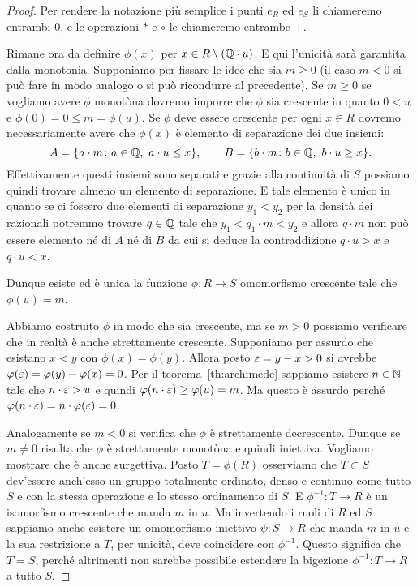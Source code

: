 \begin{proof}
Per rendere la notazione più semplice
i punti $e_R$ ed $e_S$ li chiameremo entrambi $0$,
e le operazioni $*$ e $\circ$ le chiameremo entrambe $+$.


Rimane ora da definire $\phi(x)$ per $x\in R \setminus ({\mathbb Q}\cdot u)$.
E qui l'unicità sarà garantita dalla monotonia. 
Supponiamo per fissare le idee che sia $m\ge 0$
(il caso $m<0$ si può fare in modo analogo o si può ricondurre al precedente).
Se $m\ge 0$ se vogliamo avere $\phi$ monotòna dovremo imporre che 
$\phi$ sia crescente in quanto $0<u$ e $\phi(0) = 0 \le m = \phi(u)$. 
Se $\phi$ deve essere crescente per ogni $x\in R$
dovremo necessariamente avere che $\phi(x)$ è elemento di separazione 
dei due insiemi:
\[
A = {\left\{ a\cdot m\colon a\in {\mathbb Q},\ a\cdot u \le x  \right\}},\qquad
B = {\left\{ b\cdot m\colon b\in {\mathbb Q},\ b\cdot u \ge x \right\}}.
\]
Effettivamente questi insiemi sono separati e grazie alla continuità di $S$ 
possiamo quindi trovare almeno un elemento di separazione. 
E tale elemento è unico in quanto se ci fossero due elementi di separazione 
$y_1<y_2$ per la densità dei razionali potremmo trovare $q \in {\mathbb Q}$
tale che $y_1 < q_1\cdot m < y_2$ e allora $q\cdot m$ non può essere elemento 
né di $A$ né di $B$ da cui si deduce la contraddizione 
$q\cdot u >x$ e $q\cdot u < x$.

Dunque esiste ed è unica la funzione $\phi\colon R \to S$ 
omomorfismo crescente tale che $\phi(u)=m$.

Abbiamo costruito $\phi$ in modo che sia crescente, 
ma se $m>0$ possiamo verificare che in realtà è anche strettamente crescente. 
Supponiamo per assurdo che esistano $x<y$ con $\phi(x)=\phi(y)$.
Allora posto $\varepsilon=y-x>0$ si avrebbe $\varphi(\varepsilon) = \varphi(y)-\varphi(x) = 0$. 
Per il teorema~\ref{th:archimede}
sappiamo esistere $n\in {\mathbb N}$ tale che $n\cdot \varepsilon > u$
e quindi $\varphi(n\cdot \varepsilon) \ge \varphi(u) = m$.
Ma questo è assurdo perché $\varphi(n\cdot \varepsilon) = n\cdot \varphi(\varepsilon)=0$.

Analogamente se $m<0$ si verifica che $\phi$ è strettamente decrescente.
Dunque se $m\neq 0$ risulta che $\phi$ è strettamente monotòna e quindi 
iniettiva.
Vogliamo mostrare che è anche surgettiva. 
Posto $T=\phi(R)$ osserviamo che $T\subset S$ dev'essere anch'esso 
un gruppo totalmente ordinato, denso e continuo come tutto $S$
e con la stessa operazione e lo stesso ordinamento di $S$.
E $\phi^{-1}\colon T\to R$ è un isomorfismo crescente che manda $m$ in $u$.
Ma invertendo i ruoli di $R$ ed $S$ sappiamo anche esistere un omomorfismo 
iniettivo $\psi\colon S\to R$ che manda $m$ in $u$ e la sua 
restrizione a $T$, per unicità, deve coincidere con $\phi^{-1}$.
Questo significa che $T=S$, perché altrimenti non sarebbe possibile 
estendere la bigezione $\phi^{-1}\colon T \to R$ a tutto $S$.
\end{proof}

